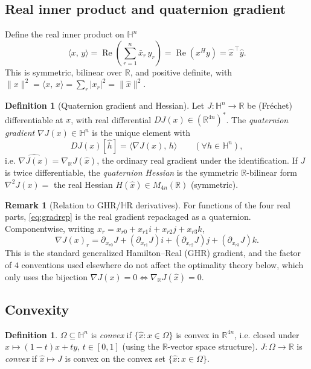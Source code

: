 \documentclass{amsart}
\theoremstyle{definition}
\newtheorem{definition}[theorem]{Definition}
\newtheorem{remark}[theorem]{Remark}
\newcommand{\HH}{\mathbb{H}}
\newcommand{\RR}{\mathbb{R}}
\newcommand{\Real}{\operatorname{Re}}
\newcommand{\inner}[2]{\langle #1,\,#2\rangle}
\begin{document}
\subsection{Real inner product and quaternion gradient}
Define the real inner product on $\HH^n$
\begin{equation}\label{eq:inner}
\inner{x}{y}=\Real\!\left(\sum_{r=1}^n \bar x_r\,y_r\right)
=\Real(x^{H}y)=\widehat x^{\,\top}\widehat y .
\end{equation}
This is symmetric, bilinear over $\RR$, and positive definite, with
$\|x\|^2=\inner{x}{x}=\sum_r|x_r|^2=\|\widehat x\|^2$.

\begin{definition}[Quaternion gradient and Hessian]
\label{def:grad}
Let $J\colon\HH^n\to\RR$ be (Fr\'echet) differentiable at $x$, with real
differential $DJ(x)\in(\RR^{4n})^*$. The \emph{quaternion gradient}
$\nabla J(x)\in\HH^n$ is the unique element with
\begin{equation}\label{eq:gradrep}
DJ(x)[\widehat h]=\inner{\nabla J(x)}{h}\qquad(\forall h\in\HH^n),
\end{equation}
i.e. $\widehat{\nabla J(x)}=\nabla_{\RR}J(\widehat x)$, the ordinary
real gradient under the identification. If $J$ is twice differentiable,
the \emph{quaternion Hessian} is the symmetric $\RR$-bilinear form
$\nabla^2J(x)=$ the real Hessian $H(\widehat x)\in M_{4n}(\RR)$
(symmetric).
\end{definition}

\begin{remark}[Relation to GHR/$\HH$R derivatives]
For functions of the four real parts, \eqref{eq:gradrep} is the
real gradient repackaged as a quaternion. Componentwise, writing
$x_r=x_{r0}+x_{r1}i+x_{r2}j+x_{r3}k$,
\[
\nabla J(x)_r=\partial_{x_{r0}}J+(\partial_{x_{r1}}J)i
+(\partial_{x_{r2}}J)j+(\partial_{x_{r3}}J)k .
\]
This is the standard generalized Hamilton--Real (GHR) gradient, and the
factor of $4$ conventions used elsewhere do not affect the optimality
theory below, which only uses the bijection
$\nabla J(x)=0\Leftrightarrow\nabla_\RR J(\widehat x)=0$.
\end{remark}

\subsection{Convexity}
\begin{definition}
$\Omega\subseteq\HH^n$ is \emph{convex} if
$\{\widehat x:x\in\Omega\}$ is convex in $\RR^{4n}$, i.e. closed under
$x\mapsto(1-t)x+ty$, $t\in[0,1]$ (using the $\RR$-vector space
structure). $J\colon\Omega\to\RR$ is \emph{convex} if
$\widehat x\mapsto J$ is convex on the convex set
$\{\widehat x:x\in\Omega\}$.
\end{definition}
\end{document}
